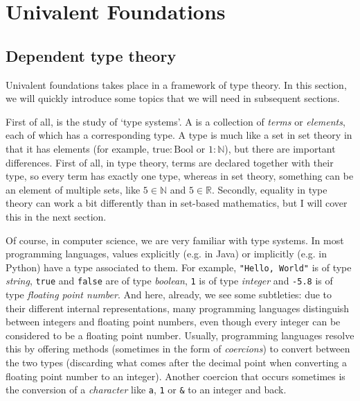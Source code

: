 \chapter{Univalent Foundations}\label{ch:univalent-foundations}

\section{Dependent type theory}
Univalent foundations takes place in a framework of type theory. In this section, we will quickly introduce some topics that we will need in subsequent sections.

First of all,  is the study of `type systems'. A  is a collection of \textit{terms} or \textit{elements}, each of which has a corresponding type. A type is much like a set in set theory in that it has elements (for example, $ \mathrm{true}: \mathrm{Bool} $ or $ 1: \mathbb N $), but there are important differences. First of all, in type theory, terms are declared together with their type, so every term has exactly one type, whereas in set theory, something can be an element of multiple sets, like $ 5 \in \mathbb N $ and $ 5 \in \mathbb R $. Secondly, equality in type theory can work a bit differently than in set-based mathematics, but I will cover this in the next section.

Of course, in computer science, we are very familiar with type systems. In most programming languages, values explicitly (e.g. in Java) or implicitly (e.g. in Python) have a type associated to them. For example, \texttt{"Hello, World"} is of type \textit{string}, \texttt{true} and \texttt{false} are of type \textit{boolean}, \texttt{1} is of type \textit{integer} and \texttt{-5.8} is of type \textit{floating point number}. And here, already, we see some subtleties: due to their different internal representations, many programming languages distinguish between integers and floating point numbers, even though every integer can be considered to be a floating point number. Usually, programming languages resolve this by offering methods (sometimes in the form of \textit{coercions}) to convert between the two types (discarding what comes after the decimal point when converting a floating point number to an integer). Another coercion that occurs sometimes is the conversion of a \textit{character} like \texttt{a}, \texttt{1} or \texttt{\&} to an integer and back.

